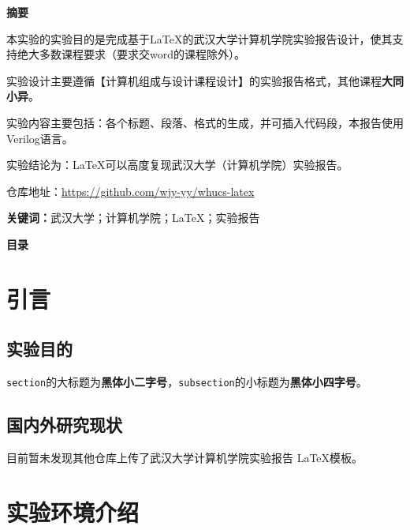 \documentclass[UTF8,a4paper,autofakebold,15pt]{ctexart}
\begin{document}
\newpage

	
	\begin{center}
		{\bf 摘\quad 要}
	\end{center}
	
	
	本实验的实验目的是完成基于\LaTeX 的武汉大学计算机学院实验报告设计，使其支持绝大多数课程要求（要求交word的课程除外）。
	
	实验设计主要遵循【计算机组成与设计课程设计】\cite{ref1}的实验报告格式，其他课程{\bf 大同小异}。
	
	实验内容主要包括：各个标题、段落、格式的生成，并可插入代码段，本报告使用Verilog语言。
	
	实验结论为：\LaTeX 可以高度复现武汉大学（计算机学院）实验报告。
	
	仓库地址：\href{https://github.com/wjy-yy/whucs-latex}{https://github.com/wjy-yy/whucs-latex}
	
	{\bf 关键词：}武汉大学；计算机学院；\LaTeX；实验报告
	
\newpage

	
	\begin{center}
		{\bf 目\quad 录}
	\end{center}
	
	
	\renewcommand{\contentsname}{}
	
	\tableofcontents
	
\newpage


\section{引言}

\subsection{实验目的}

	{\tt section}的大标题为{\bf 黑体小二字号}，{\tt subsection}的小标题为{\bf 黑体小四字号}。

\subsection{国内外研究现状}

	目前暂未发现其他仓库上传了武汉大学计算机学院实验报告 \LaTeX 模板。

\newpage

\section{实验环境介绍}
\end{document}
